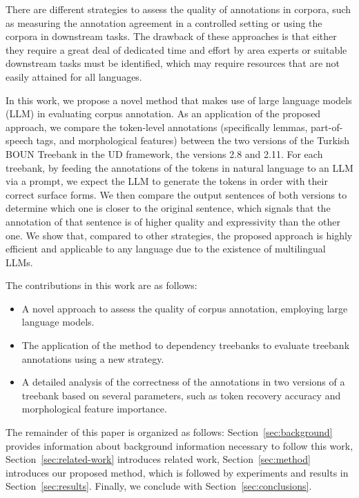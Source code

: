 There are different strategies to assess the quality of annotations in corpora, such as measuring the annotation agreement in a controlled setting or using the corpora in downstream tasks. 
The drawback of these approaches is that either they require a great deal of dedicated time and effort by area experts or  suitable downstream tasks must be identified, which may require resources that are not easily attained for all languages.

In this work, we propose a novel method that makes use of large language models (LLM) in evaluating corpus annotation. 
As an application of the proposed approach, we compare the token-level annotations (specifically lemmas, part-of-speech tags, and morphological features) between the two versions of the Turkish BOUN Treebank in the UD framework, the versions 2.8 and 2.11. 
For each treebank, by feeding the annotations of the tokens in natural language to an LLM via a prompt, we expect the LLM to generate the tokens in order with their correct surface forms.
We then compare the output sentences of both versions to determine which one is closer to the original sentence, which signals that the annotation of that sentence is of higher quality and expressivity than the other one. 
We show that, compared to other strategies, the proposed approach is highly efficient and applicable to any language due to the existence of multilingual LLMs.

The contributions in this work are as follows:
\begin{itemize}
    \item A novel approach to assess the quality of corpus annotation, employing large language models.
    \item The application of the method to dependency treebanks to evaluate treebank annotations using a new strategy.
    \item A detailed analysis of the correctness of the annotations in two versions of a treebank based on several parameters, such as token recovery accuracy and morphological feature importance.
\end{itemize}

The remainder of this paper is organized as follows: Section~\ref{sec:background} provides information about background information necessary to follow this work, Section~\ref{sec:related-work} introduces related work, Section~\ref{sec:method} introduces our proposed method, which is followed by experiments and results in Section~\ref{sec:results}. Finally, we conclude with Section~\ref{sec:conclusions}.

